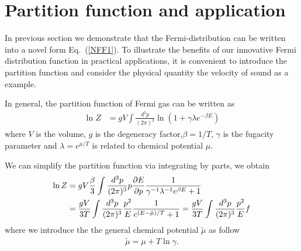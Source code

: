 \documentclass[sn-mathphys,Numbered]{sn-jnl}
\theoremstyle{thmstyleone}%
\theoremstyle{thmstyletwo}%
\theoremstyle{thmstylethree}%
\begin{document}

\section{Partition function and application}\label{NumericalResult}
In previous section we demonstrate that the Fermi-distribution can be written into a novel form Eq.~(\ref{NFF1}). To illustrate the benefits of our innovative Fermi distribution function in practical applications, it is convenient to introduce the partition function and consider the physical quantity the velocity of sound as a example.

In general, the partition function of Fermi gas can be written as
\cite{letessier_rafelski_2023}
\begin{align}
\ln{Z}&={gV}\int \frac{d^3p}{(2\pi)^3}\ln(1+\gamma\lambda e^{-\beta E})
\end{align}
where $V$ is the volume, $g$ is the degeneracy factor,$\beta=1/T$,  $\gamma$ is the fugacity parameter and $\lambda=e^{\mu/T}$ is related to chemical potential $\mu$. 

We can simplify the partition function via integrating by parts, we obtain
\begin{align}
\ln{Z}&=gV\frac{\beta}{3}\int \frac{d^3p}{(2\pi)^3}p\frac{\partial E}{\partial p}\frac{1}{\gamma^{-1}\lambda^{-1}e^{\beta E}+1}\notag\\
&=\frac{gV}{3T}\int\frac{d^3p}{(2\pi)^3}\frac{p^2}{E}\frac{1}{e^{(E-\tilde\mu)/T}+1}
=\frac{gV}{3T}\int \frac{d^3p}{(2\pi)^3}\frac{p^2}{E}f
\end{align}
where we introduce the the general chemical potential $\tilde\mu$ as follow
\begin{align}
\tilde\mu=\mu+T\ln\gamma.
\end{align}
\end{document}
